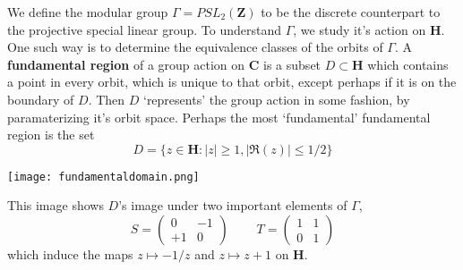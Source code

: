 We define the modular group $\Gamma = PSL_2(\mathbf{Z})$ to be the discrete counterpart to the projective special linear group. To understand $\Gamma$, we study it's action on $\mathbf{H}$. One such way is to determine the equivalence classes of the orbits of $\Gamma$. A {\bf fundamental region} of a group action on $\mathbf{C}$ is a subset $D \subset \mathbf{H}$ which contains a point in every orbit, which is unique to that orbit, except perhaps if it is on the boundary of $D$. Then $D$ `represents' the group action in some fashion, by paramaterizing it's orbit space. Perhaps the most `fundamental' fundamental region is the set
%
\[ D = \{ z \in \mathbf{H} : |z| \geq 1, |\Re(z)| \leq 1/2 \} \]
%
\begin{center}
\texttt{[image: fundamentaldomain.png]}
\end{center}
%
This image shows $D$'s image under two important elements of $\Gamma$,
%
\[ S = \begin{pmatrix} 0 & -1 \\ +1 & 0 \end{pmatrix}\ \ \ \ \ \ \ \ \ \ T = \begin{pmatrix} 1 & 1 \\ 0 & 1 \end{pmatrix} \]
%
which induce the maps $z \mapsto -1/z$ and $z \mapsto z + 1$ on $\mathbf{H}$.

